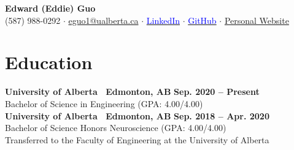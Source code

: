 \documentclass{article}
\begin{document}
\thispagestyle{plain}
\begin{center}
    \LARGE \textbf{\textcolor{my_colour}{Edward (Eddie) Guo}}\\ \vspace{0.25em}
    \normalfont \normalsize (587) 988-0292
        \hspace{.25em} $\boldsymbol{\cdot}$ \hspace{.25em}
    \href{mailto:eguo1@ualberta.ca}{eguo1@ualberta.ca}
        \hspace{.25em} $\boldsymbol{\cdot}$ \hspace{.25em}
    \href{https://www.linkedin.com/in/eguo1}{\textcolor{blue}{LinkedIn}}
        \hspace{.25em} $\boldsymbol{\cdot}$ \hspace{.25em}
    \href{https://github.com/tig3r66}{\textcolor{blue}{GitHub}}
        \hspace{.25em} $\boldsymbol{\cdot}$ \hspace{.25em}
    \href{https://tig3r66.github.io/index.html}{Personal Website}
\end{center}

\section*{\textcolor{my_colour}{Education}}
\vspace{-.25em} \hrulefill \vspace{.75em}

\textbf{University of Alberta \textbar\ Edmonton, AB} \hfill \textbf{Sep. 2020 -- Present}\\
Bachelor of Science in Engineering (GPA: 4.00/4.00)\\


\textbf{University of Alberta \textbar\ Edmonton, AB} \hfill \textbf{Sep. 2018 -- Apr. 2020}\\
Bachelor of Science Honors Neuroscience (GPA: 4.00/4.00)\\
Transferred to the Faculty of Engineering at the University of Alberta


\end{document}
